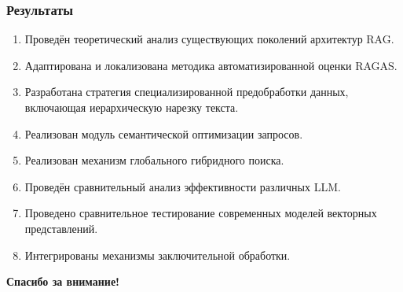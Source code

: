 \documentclass[aspectratio=169, xcolor=table]{beamer} %
\begin{document}
\begin{frame}
\frametitle{Результаты}
\small
\begin{enumerate}
    \item Проведён теоретический анализ существующих поколений архитектур RAG.
    \item Адаптирована и локализована методика автоматизированной оценки RAGAS.
    \item Разработана стратегия специализированной предобработки данных, включающая иерархическую нарезку текста.
    \item Реализован модуль семантической оптимизации запросов.
    \item Реализован механизм глобального гибридного поиска.
    \item Проведён сравнительный анализ эффективности различных LLM.
    \item Проведено сравнительное тестирование современных моделей векторных представлений.
    \item Интегрированы механизмы заключительной обработки.
\end{enumerate}
\end{frame}

\begin{frame}
\vspace{2cm}
\centering
\Huge \textbf{Спасибо за внимание!}
\end{frame}
\end{document}
